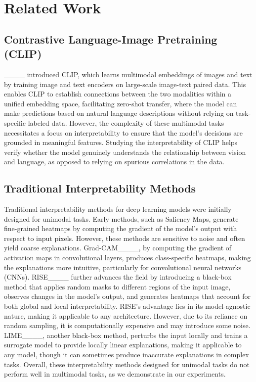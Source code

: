 \section{Related Work}
\subsection{Contrastive Language-Image Pretraining (CLIP)}
____ introduced CLIP, which learns multimodal embeddings of images and text by training image and text encoders on large-scale image-text paired data. This enables CLIP to establish connections between the two modalities within a unified embedding space, facilitating zero-shot transfer, where the model can make predictions based on natural language descriptions without relying on task-specific labeled data. However, the complexity of these multimodal tasks necessitates a focus on interpretability to ensure that the model’s decisions are grounded in meaningful features. Studying the interpretability of CLIP helps verify whether the model genuinely understands the relationship between vision and language, as opposed to relying on spurious correlations in the data.

\subsection{Traditional Interpretability Methods}
Traditional interpretability methods for deep learning models were initially designed for unimodal tasks. Early methods, such as Saliency Maps, generate fine-grained heatmaps by computing the gradient of the model's output with respect to input pixels. However, these methods are sensitive to noise and often yield coarse explanations. Grad-CAM____, by computing the gradient of activation maps in convolutional layers, produces class-specific heatmaps, making the explanations more intuitive, particularly for convolutional neural networks (CNNs). RISE____ further advances the field by introducing a black-box method that applies random masks to different regions of the input image, observes changes in the model's output, and generates heatmaps that account for both global and local interpretability. RISE’s advantage lies in its model-agnostic nature, making it applicable to any architecture. However, due to its reliance on random sampling, it is computationally expensive and may introduce some noise. LIME____, another black-box method, perturbs the input locally and trains a surrogate model to provide locally linear explanations, making it applicable to any model, though it can sometimes produce inaccurate explanations in complex tasks. Overall, these interpretability methods designed for unimodal tasks do not perform well in multimodal tasks, as we demonstrate in our experiments.%

